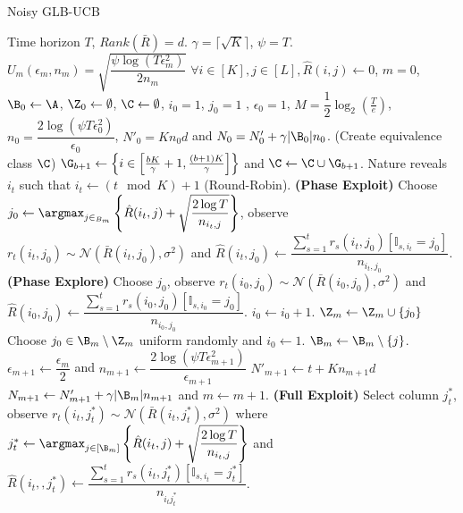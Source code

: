 \begin{algorithm}[!th]
\caption{Noisy GLB-UCB}
\label{alg:NGLB}
\begin{algorithmic}[1]
 Time horizon $T$, $Rank(\bar{R}) = d$.
 $\gamma = \lceil\sqrt{K} \rceil$, $\psi = T$.
 $U_m(\epsilon_m, n_m) = \sqrt{\dfrac{\psi\log(T\epsilon_m^2)}{2n_m} }$
 $\forall i\in [K], j\in [L], \hat{R}(i,j) \leftarrow 0$, $m=0$, $\B_0 \leftarrow \A$, $\Z_0 \leftarrow \emptyset$, $\C \leftarrow \emptyset$,  $i_0=1$, $j_0=1$ , $\epsilon_0 = 1$, $M=\dfrac{1}{2}\log_2\left( \frac{T}{e}\right)$, $n_0 = \dfrac{2\log(\psi T\epsilon_{0}^2)}{\epsilon_{0}} $, $N'_0 = K n_0 d$ and $N_0 = N'_0 + \gamma |\B_0|n_0$.
 (Create equivalence class $\C$)
\State  $\G_{b+1}\leftarrow \left\lbrace i\in \left[\frac{bK}{\gamma}+1,\frac{(b+1)K}{\gamma}\right]\right\rbrace$ and $\C\leftarrow \C\cup \G_{b+1}$.
\EndFor
{}	
\State Nature reveals $i_t$ such that $i_t \leftarrow (t \mod K) + 1$ (Round-Robin).
 \textbf{ (Phase Exploit) }
\State Choose $j_0\leftarrow \argmax_{j\in_{B_m}}\left\lbrace \hat{R}(i_t,j)  + \sqrt{\dfrac{2\log T}{n_{i_t,j}}}\right\rbrace $, observe $r_t(i_t,j_0)\sim \mathcal{N}(\bar{R}(i_t,j_0),\sigma^2)$ and $\hat{R}(i_t,j_0)\leftarrow \dfrac{\sum_{s=1}^{t}r_s(i_t,j_0)[\mathbb{I}_{s,i_t} = j_0]}{n_{i_t,j_0}}$.
 \textbf{ (Phase Explore) }
\State Choose $j_0$, observe $r_t(i_0,j_0)\sim\mathcal{N}(\bar{R}(i_0,j_0),\sigma^2) $ and $\hat{R}(i_0,j_0)\leftarrow \dfrac{\sum_{s=1}^{t}r_s(i_0,j_0)[\mathbb{I}_{s,i_0} = j_0]}{n_{i_0,j_0}}$.
\State $i_0 \leftarrow i_0 + 1$.
\Else
\State $\Z_m \leftarrow \Z_m \cup \lbrace j_0\rbrace$
\State Choose $j_0\in\B_m\setminus \Z_m$ uniform randomly and $i_0 \leftarrow 1$.
\EndIf
\Else
\ColElim
\State {}
\State {}
\State $\B_m \leftarrow \B_m \setminus \lbrace j \rbrace$. 
\EndWhile
\EndFor
\EndColElim
\ResParam
\State $\epsilon_{m+1} \leftarrow \dfrac{\epsilon_m}{2}$ and $n_{m+1} \leftarrow \dfrac{2\log(\psi T\epsilon_{m+1}^2)}{\epsilon_{m+1}}$
\State $N'_{m+1}\leftarrow t + K n_{m+1} d$
\State $N_{m+1} \leftarrow N'_{m+1} + \gamma |\B_m|n_{m+1}$ and $m \leftarrow m + 1$.
\EndResParam
\EndIf
\Else \textbf{ (Full Exploit) }
\State  Select column $j_t^*$, observe $r_t(i_t,j_t^*)\sim \mathcal{N}(\bar{R}(i_t,j_t^*),\sigma^2)$ where $j_t^* \leftarrow \argmax_{j\in[\B_m]} \left\lbrace \hat{R}(i_t,j) + \sqrt{\dfrac{2\log T}{n_{i_t,j}}}\right\rbrace$ and $\hat{R}(i_t,,j_t^*)\leftarrow \dfrac{\sum_{s=1}^{t}r_s(i_t,j_t^*)[\mathbb{I}_{s,i_t} = j_t^*]}{n_{i_tj_t^*}}$.
\EndIf
\EndFor
\end{algorithmic}
\end{algorithm}



